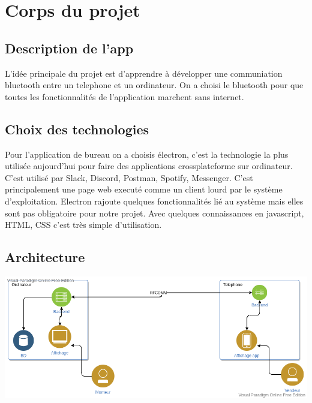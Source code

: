 \documentclass[12pt,fleqn]{article}
\begin{document}
\section{Corps du projet}

\subsection{Description de l'app}
L'idée principale du projet est d'apprendre à développer une communiation bluetooth entre un telephone et un ordinateur. On a choisi le bluetooth pour que toutes les fonctionnalités de l'application marchent sans internet.

\subsection{Choix des technologies}
Pour l'application de bureau on a choisis électron, c'est la technologie la plus utilisée aujourd'hui pour faire des applications crossplateforme sur ordinateur. C'est utilisé par Slack, Discord, Postman, Spotify, Messenger. C'est principalement une page web executé comme un client lourd par le système d'exploitation. Electron rajoute quelques fonctionnalités lié au système mais elles sont pas obligatoire pour notre projet. Avec quelques connaissances en javascript, HTML, CSS c'est très simple d'utilisation.  

\subsection{Architecture}

\includegraphics[scale=0.5]{images/architecture_ift592.png}
\end{document}

